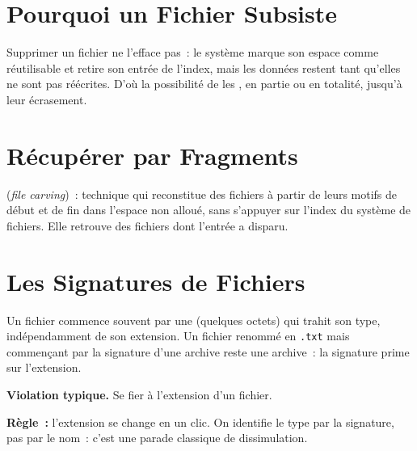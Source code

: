 \separateur

\section{Pourquoi un Fichier Subsiste}
\label{sec:c11-subsiste}

Supprimer un fichier ne l'efface pas~: le système marque son espace comme
réutilisable et retire son entrée de l'index, mais les données restent tant
qu'elles ne sont pas réécrites. D'où la possibilité de les
, en partie ou en totalité, jusqu'à leur écrasement.

\section{Récupérer par Fragments}
\label{sec:c11-carving}

\begin{boxdef}
 (\textit{file carving})~: technique qui
reconstitue des fichiers à partir de leurs motifs de début et de fin dans
l'espace non alloué, sans s'appuyer sur l'index du système de fichiers. Elle
retrouve des fichiers dont l'entrée a disparu.
\end{boxdef}

\section{Les Signatures de Fichiers}
\label{sec:c11-signatures}

Un fichier commence souvent par une  (quelques octets)
qui trahit son type, indépendamment de son extension. Un fichier renommé en
\texttt{.txt} mais commençant par la signature d'une archive reste une
archive~: la signature prime sur l'extension.

\begin{boxalert}
\textbf{Violation typique.} Se fier à l'extension d'un fichier.

\smallskip
\textbf{Règle~:} l'extension se change en un clic. On identifie le type par la
signature, pas par le nom~: c'est une parade classique de dissimulation.
\end{boxalert}

